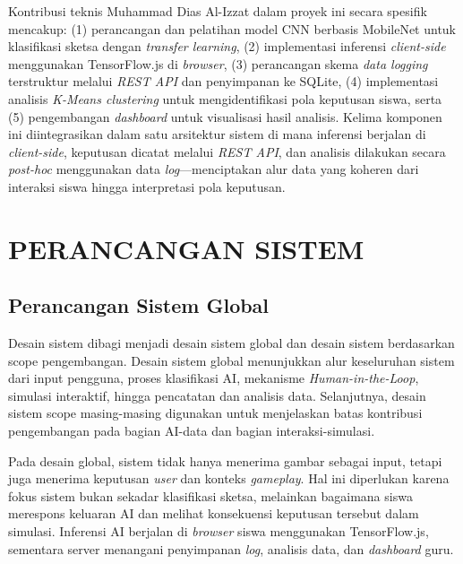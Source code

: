 \documentclass[10pt,twoside,openright]{report}
\begin{document}
Kontribusi teknis Muhammad Dias Al-Izzat dalam proyek ini secara spesifik mencakup: (1) perancangan dan pelatihan model CNN berbasis MobileNet untuk klasifikasi sketsa dengan \textit{transfer learning}, (2) implementasi inferensi \textit{client-side} menggunakan TensorFlow.js di \textit{browser}, (3) perancangan skema \textit{data logging} terstruktur melalui \textit{REST API} dan penyimpanan ke SQLite, (4) implementasi analisis \textit{K-Means clustering} untuk mengidentifikasi pola keputusan siswa, serta (5) pengembangan \textit{dashboard} untuk visualisasi hasil analisis. Kelima komponen ini diintegrasikan dalam satu arsitektur sistem di mana inferensi berjalan di \textit{client-side}, keputusan dicatat melalui \textit{REST API}, dan analisis dilakukan secara \textit{post-hoc} menggunakan data \textit{log}—menciptakan alur data yang koheren dari interaksi siswa hingga interpretasi pola keputusan.


\chapter{PERANCANGAN SISTEM}
\label{chap:bab3}

\section{Perancangan Sistem Global}
\label{sec:perancangan-sistem-global}

Desain sistem dibagi menjadi desain sistem global dan desain sistem berdasarkan scope pengembangan. Desain sistem global menunjukkan alur keseluruhan sistem dari input pengguna, proses klasifikasi AI, mekanisme \textit{Human-in-the-Loop}, simulasi interaktif, hingga pencatatan dan analisis data. Selanjutnya, desain sistem scope masing-masing digunakan untuk menjelaskan batas kontribusi pengembangan pada bagian AI-data dan bagian interaksi-simulasi.

Pada desain global, sistem tidak hanya menerima gambar sebagai input, tetapi juga menerima keputusan \textit{user} dan konteks \textit{gameplay}. Hal ini diperlukan karena fokus sistem bukan sekadar klasifikasi sketsa, melainkan bagaimana siswa merespons keluaran AI dan melihat konsekuensi keputusan tersebut dalam simulasi. Inferensi AI berjalan di \textit{browser} siswa menggunakan TensorFlow.js, sementara server menangani penyimpanan \textit{log}, analisis data, dan \textit{dashboard} guru.
\end{document}
